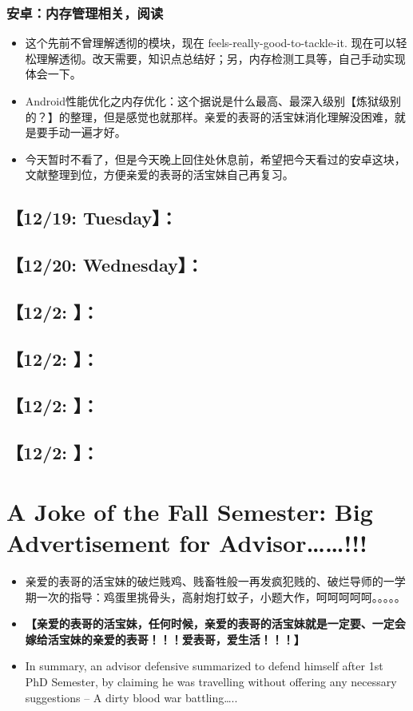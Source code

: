 \documentclass[9pt, b5paper]{article}
\begin{document}
\subsubsection{安卓：内存管理相关，阅读}
\label{sec-2-1-3}
\begin{itemize}
\item 这个先前不曾理解透彻的模块，现在 feels-really-good-to-tackle-it. 现在可以轻松理解透彻。改天需要，知识点总结好；另，内存检测工具等，自己手动实现体会一下。
\item Android性能优化之内存优化：这个据说是什么最高、最深入级别【炼狱级别的？】的整理，但是感觉也就那样。亲爱的表哥的活宝妹消化理解没困难，就是要手动一遍才好。
\item 今天暂时不看了，但是今天晚上回住处休息前，希望把今天看过的安卓这块，文献整理到位，方便亲爱的表哥的活宝妹自己再复习。
\end{itemize}
\subsection{【12/19: Tuesday】：}
\label{sec-2-2}
\subsection{【12/20: Wednesday】：}
\label{sec-2-3}
\subsection{【12/2: 】：}
\label{sec-2-4}
\subsection{【12/2: 】：}
\label{sec-2-5}
\subsection{【12/2: 】：}
\label{sec-2-6}
\subsection{【12/2: 】：}
\label{sec-2-7}

\section{A Joke of the Fall Semester: Big Advertisement for Advisor\ldots{}\ldots{}!!!}
\label{sec-3}
\begin{itemize}
\item 亲爱的表哥的活宝妹的破烂贱鸡、贱畜牲般一再发疯犯贱的、破烂导师的一学期一次的指导：鸡蛋里挑骨头，高射炮打蚊子，小题大作，呵呵呵呵呵。。。。。
\item \textbf{【亲爱的表哥的活宝妹，任何时候，亲爱的表哥的活宝妹就是一定要、一定会嫁给活宝妹的亲爱的表哥！！！爱表哥，爱生活！！！】}
\item In summary, an advisor defensive summarized to defend himself after 1st PhD Semester, by claiming he was travelling without offering any necessary suggestions -- A dirty blood war battling\ldots{}..
\end{itemize}
\end{document}
